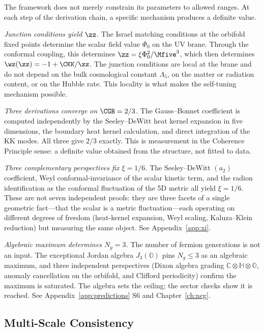 The framework does not merely constrain its parameters to allowed
ranges. At each step of the derivation chain, a specific mechanism
produces a definite value.

\textit{Junction conditions yield $\zz$.} The Israel matching
conditions at the orbifold fixed points determine the scalar field
value $\Phi_0$ on the UV brane. Through the conformal coupling, this
determines $\zz = \xi \Phi_0^2 / \Mfive^3$, which then determines
$\wz(\zz) = -1 + \CKK / \zz$. The junction conditions are local at the
brane and do not depend on the bulk cosmological constant $\Lambda_5$,
on the matter or radiation content, or on the Hubble rate. This
locality is what makes the self-tuning mechanism possible.

\textit{Three derivations converge on $\CGB = 2/3$.} The Gauss--Bonnet
coefficient is computed independently by the Seeley--DeWitt heat
kernel expansion in five dimensions, the boundary heat kernel
calculation, and direct integration of the KK modes. All three give
$2/3$ exactly. This is measurement in the Coherence Principle sense:
a definite value obtained from the structure, not fitted to data.

\textit{Three complementary perspectives fix $\xi = 1/6$.} The
Seeley--DeWitt $(a_2)$ coefficient, Weyl conformal-invariance of the
scalar kinetic term, and the radion identification as the conformal
fluctuation of the 5D metric all yield $\xi = 1/6$. These are not
seven independent proofs: they are three facets of a single geometric
fact---that the scalar is a metric fluctuation---each operating on
different degrees of freedom (heat-kernel expansion, Weyl scaling,
Kaluza--Klein reduction) but measuring the same object. See
Appendix~\ref{app:xi}.

\textit{Algebraic maximum determines $N_g = 3$.} The number of fermion
generations is not an input. The exceptional Jordan algebra
$J_3(\mathbb{O})$ pins $N_g \leq 3$ as an algebraic maximum, and three
independent perspectives (Dixon algebra grading
$\mathbb{C} \otimes \mathbb{H} \otimes \mathbb{O}$, anomaly cancellation
on the orbifold, and Clifford periodicity) confirm the maximum is
saturated. The algebra sets the ceiling; the sector checks show it is
reached. See Appendix~\ref{app:predictions} S6 and
Chapter~\ref{ch:ncg}.

\subsection{Multi-Scale Consistency}
\label{sec:0-multiscale}

